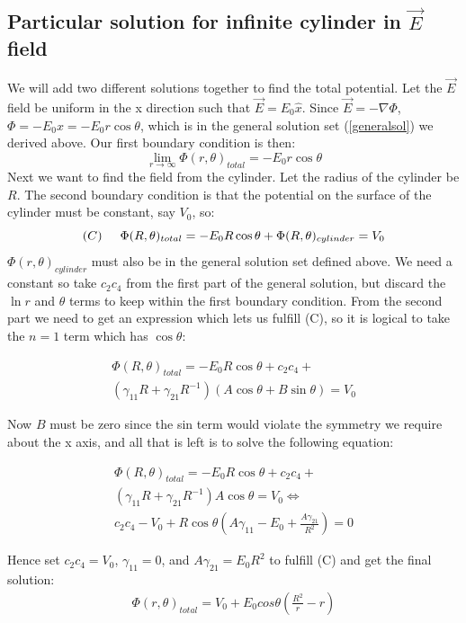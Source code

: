 \documentclass[aps,twocolumn,pre,nofootinbib,10pt]{revtex4-1}
\begin{document}
\subsection{Particular solution for infinite cylinder in $\vec{E}$ field}
We will add two different solutions together to find the total potential. Let the $\vec{E}$ field be uniform in the x direction
such that $\vec{E} = E_0 \hat{x}$. Since $\vec{E} = - \nabla \Phi$, $\Phi = -E_0 x = -E_0 r \cos\theta$, which is
in the general solution set (\ref{generalsol}) we derived above.
Our first
boundary condition is then:
\[ \lim_{r \rightarrow \infty} \Phi(r,\theta)_{total} = -E_0 r \cos\theta \]
Next we want to find the field from the cylinder. Let the radius of the cylinder be $R$.
The second boundary condition is that the potential on the surface of the cylinder must be constant,
say $V_0$, so:
\[ (C) \hspace{0.5cm} \Phi(R,\theta)_{total} = -E_0 R \cos\theta + \Phi(R,\theta)_{cylinder} = V_0 \]
$\Phi(r,\theta)_{cylinder}$ must also be in the general solution set defined above. We need a constant so take $c_2 c_4$ from the first
part of the general solution, but discard the
$\ln r$ and $\theta$ terms to keep within the first boundary condition.
From the second part we need to get an expression which lets us fulfill (C), so it is logical to take the $n = 1$ term which has $\cos\theta$:

\begin{gather*}
 \Phi(R,\theta)_{total} = -E_0 R \cos\theta +  c_2 c_4 + \\
(\gamma_{11} R + \gamma_{21} R^{-1}) (A\cos\theta + B \sin\theta) = V_0 
\end{gather*}

Now $B$ must be zero since the sin term would violate the symmetry we require about the x axis, and all that is left is to solve the following equation:

\begin{gather*}
 \Phi(R,\theta)_{total} = -E_0 R \cos\theta + c_2 c_4 + \\
(\gamma_{11} R + \gamma_{21} R^{-1}) A\cos\theta = V_0 \Leftrightarrow \\
 c_2 c_4 - V_0 + R \cos\theta \left( A\gamma_{11} - E_0 + \frac{A\gamma_{21}}{R^2} \right) = 0 
\end{gather*}

Hence set $c_2 c_4 = V_0$, $\gamma_{11} = 0$, and $A\gamma_{21} = E_0 R^2$ to fulfill (C) and get the final solution:
\begin{gather}
 \Phi(r,\theta)_{total} = V_0 + E_0 cos\theta \left( \frac{R^2}{r} - r \right)
 \label{analyticsol}
\end{gather}
\end{document}
